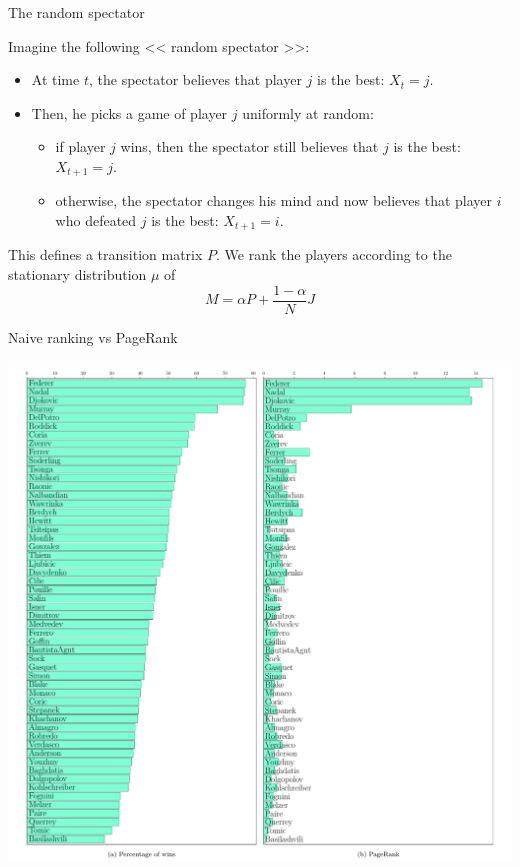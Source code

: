 \documentclass{beamer}
\begin{document}
\begin{frame}[t]{The random spectator}
	\grid

	\vspace{-0.15cm}

	Imagine the following << random spectator >>:

	\vspace{0.15cm}
	\begin{itemize}
		\item At time $t$, the spectator believes that player $j$ is the best: $X_t = j$.
	\vspace{0.3cm}
		\item Then, he picks a game of player $j$ uniformly at random:
	\vspace{0.3cm}

			\begin{itemize}
				\item if player $j$ wins, then the spectator still believes that $j$ is the best: $X_{t+1}=j$.
	\vspace{0.2cm}
				\item otherwise, the spectator changes his mind and now believes that player $i$ who defeated $j$ is the best: $X_{t+1}=i$.
			\end{itemize}
	\end{itemize}

	\pause
	\vspace{0.5cm}
This defines a transition matrix $P$. We rank the players according to the stationary distribution $\mu$ of
$$
M = \alpha P + \frac{1-\alpha}{N} J
$$
\end{frame}

\begin{frame}[t]{Naive ranking vs PageRank}
	\grid

	\vspace{-1.0cm}
	\begin{center}
		\hspace*{-1.3cm}
		\includegraphics[width=13.5cm]{../pagerank_tennis.pdf}
	\end{center}
\end{frame}
\end{document}
